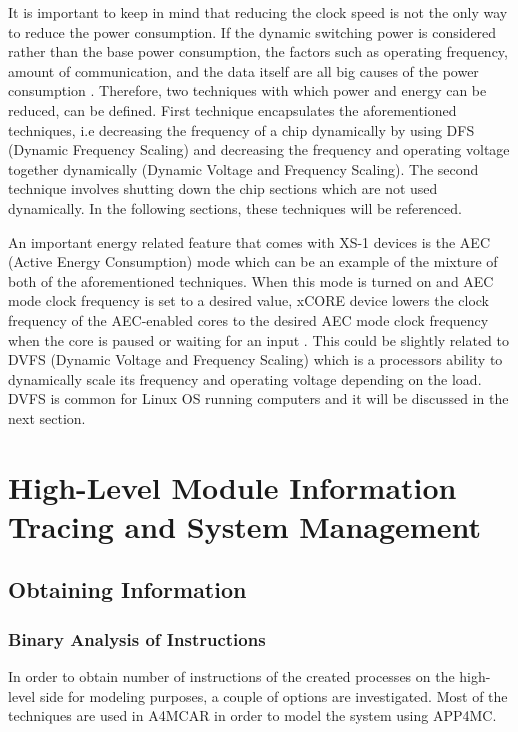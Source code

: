 It is important to keep in mind that reducing the clock speed is not the only way to reduce the power consumption. If the dynamic switching power is considered rather than the base power consumption, the factors such as operating frequency, amount of communication, and the data itself are all big causes of the power consumption \cite{xs1energymanual}. Therefore, two techniques with which power and energy can be reduced, can be defined. First technique encapsulates the aforementioned techniques, i.e decreasing the frequency of a chip dynamically by using DFS (Dynamic Frequency Scaling) and decreasing the frequency and operating voltage together dynamically (Dynamic Voltage and Frequency Scaling). The second technique involves shutting down the chip sections which are not used dynamically. In the following sections, these techniques will be referenced.

An important energy related feature that comes with XS-1 devices is the AEC (Active Energy Consumption) mode \cite{xs1energymanual} which can be an example of the mixture of both of the aforementioned techniques. When this mode is turned on and AEC mode clock frequency is set to a desired value, xCORE device lowers the clock frequency of the AEC-enabled cores to the desired AEC mode clock frequency when the core is paused or waiting for an input \cite{xs1energymanual}. This could be slightly related to DVFS (Dynamic Voltage and Frequency Scaling) \cite{dvfsieee} which is a processors ability to dynamically scale its frequency and operating voltage depending on the load. DVFS is common for Linux OS running computers and it will be discussed in the next section.

\section{High-Level Module Information Tracing and System Management}

\subsection{Obtaining Information}
\subsubsection{Binary Analysis of Instructions}
In order to obtain number of instructions of the created processes on the high-level side for modeling purposes, a couple of options are investigated. Most of the techniques are used in A4MCAR in order to model the system using APP4MC.

